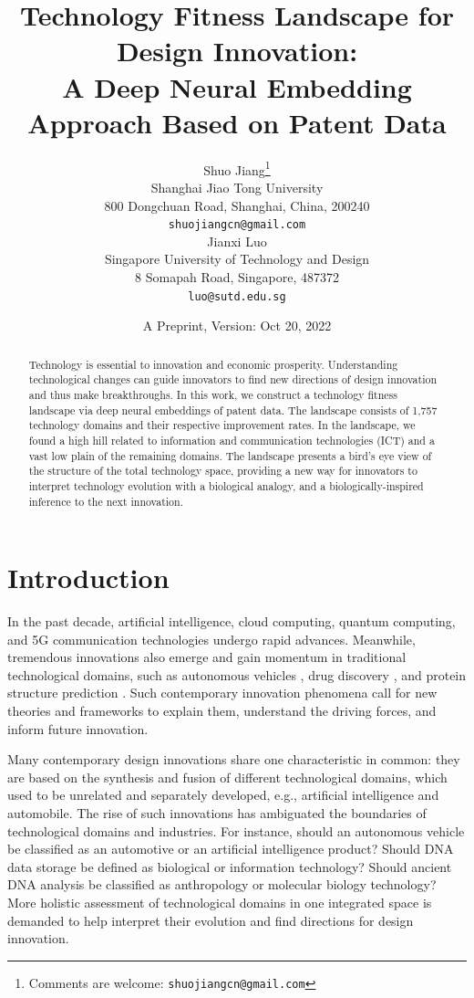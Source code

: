\documentclass{article}
\title{Technology Fitness Landscape for Design Innovation: \\ A Deep Neural Embedding Approach Based on Patent Data}
\date{A Preprint, Version: Oct 20, 2022} 					%
\author{ 
{
\hspace{1mm}Shuo Jiang}\thanks{Comments are welcome: \texttt{shuojiangcn@gmail.com}} \\
	Shanghai Jiao Tong University\\
	800 Dongchuan Road, Shanghai, China, 200240\\
	\texttt{shuojiangcn@gmail.com} \\
	\And
	{\hspace{1mm}Jianxi Luo} \\
	Singapore University of Technology and Design\\
	8 Somapah Road, Singapore, 487372\\
	\texttt{luo@sutd.edu.sg} \\
}
\begin{document}
\maketitle

\begin{abstract}
	Technology is essential to innovation and economic prosperity. Understanding technological changes can guide innovators to find new directions of design innovation and thus make breakthroughs. In this work, we construct a technology fitness landscape via deep neural embeddings of patent data. The landscape consists of 1,757 technology domains and their respective improvement rates. In the landscape, we found a high hill related to information and communication technologies (ICT) and a vast low plain of the remaining domains. The landscape presents a bird’s eye view of the structure of the total technology space, providing a new way for innovators to interpret technology evolution with a biological analogy, and a biologically-inspired inference to the next innovation.
\end{abstract}


\section{Introduction}
\label{sec1}

In the past decade, artificial intelligence, cloud computing, quantum computing, and 5G communication technologies undergo rapid advances. Meanwhile, tremendous innovations also emerge and gain momentum in traditional technological domains, such as autonomous vehicles \cite{claybrook2018autonomous}, drug discovery \cite{vamathevan2019applications}, and protein structure prediction \cite{jumper2021highly}. Such contemporary innovation phenomena call for new theories and frameworks to explain them, understand the driving forces, and inform future innovation.

Many contemporary design innovations share one characteristic in common: they are based on the synthesis and fusion of different technological domains, which used to be unrelated and separately developed, e.g., artificial intelligence and automobile. The rise of such innovations has ambiguated the boundaries of technological domains and industries. For instance, should an autonomous vehicle \cite{claybrook2018autonomous} be classified as an automotive or an artificial intelligence product? Should DNA data storage \cite{church2012next} be defined as biological or information technology? Should ancient DNA analysis \cite{Hofreiter2001} be classified as anthropology or molecular biology technology? More holistic assessment of technological domains in one integrated space is demanded to help interpret their evolution and find directions for design innovation.
\end{document}
